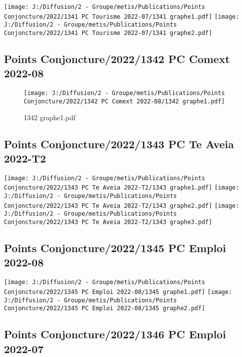 \documentclass[
]{article}
\begin{document}
\texttt{[image: J:/Diffusion/2 - Groupe/metis/Publications/Points Conjoncture/2022/1341 PC Tourisme 2022-07/1341 graphe1.pdf]}
\texttt{[image: J:/Diffusion/2 - Groupe/metis/Publications/Points Conjoncture/2022/1341 PC Tourisme 2022-07/1341 graphe2.pdf]}

\hypertarget{points-conjoncture20221342-pc-comext-2022-08}{%
\subsection{Points Conjoncture/2022/1342 PC Comext
2022-08}\label{points-conjoncture20221342-pc-comext-2022-08}}

\begin{figure}
\centering
\texttt{[image: J:/Diffusion/2 - Groupe/metis/Publications/Points Conjoncture/2022/1342 PC Comext 2022-08/1342 graphe1.pdf]}
\caption{1342 graphe1.pdf}
\end{figure}

\hypertarget{points-conjoncture20221343-pc-te-aveia-2022-t2}{%
\subsection{Points Conjoncture/2022/1343 PC Te Aveia
2022-T2}\label{points-conjoncture20221343-pc-te-aveia-2022-t2}}

\texttt{[image: J:/Diffusion/2 - Groupe/metis/Publications/Points Conjoncture/2022/1343 PC Te Aveia 2022-T2/1343 graphe1.pdf]}
\texttt{[image: J:/Diffusion/2 - Groupe/metis/Publications/Points Conjoncture/2022/1343 PC Te Aveia 2022-T2/1343 graphe2.pdf]}
\texttt{[image: J:/Diffusion/2 - Groupe/metis/Publications/Points Conjoncture/2022/1343 PC Te Aveia 2022-T2/1343 graphe3.pdf]}

\hypertarget{points-conjoncture20221345-pc-emploi-2022-08}{%
\subsection{Points Conjoncture/2022/1345 PC Emploi
2022-08}\label{points-conjoncture20221345-pc-emploi-2022-08}}

\texttt{[image: J:/Diffusion/2 - Groupe/metis/Publications/Points Conjoncture/2022/1345 PC Emploi 2022-08/1345 graphe1.pdf]}
\texttt{[image: J:/Diffusion/2 - Groupe/metis/Publications/Points Conjoncture/2022/1345 PC Emploi 2022-08/1345 graphe2.pdf]}

\hypertarget{points-conjoncture20221346-pc-emploi-2022-07}{%
\subsection{Points Conjoncture/2022/1346 PC Emploi
2022-07}\label{points-conjoncture20221346-pc-emploi-2022-07}}
\end{document}
